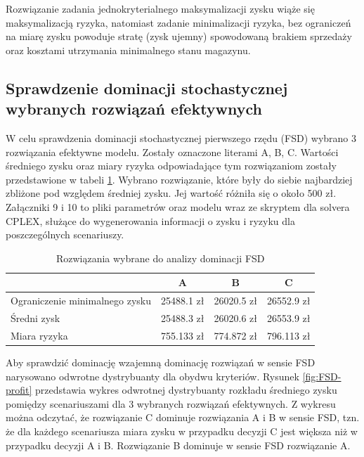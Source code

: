 \documentclass[11pt,a4paper]{article}
\begin{document}
Rozwiązanie zadania jednokryterialnego maksymalizacji zysku wiąże się maksymalizacją ryzyka, natomiast zadanie minimalizacji ryzyka, bez ograniczeń na miarę zysku powoduje stratę (zysk ujemny) spowodowaną brakiem sprzedaży oraz kosztami utrzymania minimalnego stanu magazynu.

\subsection{Sprawdzenie dominacji stochastycznej wybranych rozwiązań efektywnych}

W celu sprawdzenia dominacji stochastycznej pierwszego rzędu (FSD) wybrano 3 rozwiązania efektywne modelu. Zostały oznaczone literami A, B, C. Wartości średniego zysku oraz miary ryzyka odpowiadające tym rozwiązaniom zostały przedstawione w tabeli \ref{tab:abc}. Wybrano rozwiązanie, które były do siebie najbardziej zbliżone pod względem średniej zysku. Jej wartość różniła się o około 500 zł. Załączniki 9 i 10 to pliki parametrów oraz modelu wraz ze skryptem dla solvera CPLEX, służące do wygenerowania informacji o zysku i ryzyku dla poszczególnych scenariuszy.

\begin{table}[ht!]
  \label{tab:abc}
  \caption{Rozwiązania wybrane do analizy dominacji FSD}
  \centering
  \begin{tabular}{lccc}
  	\hline
              			& A & B & C \\
	\hline
	Ograniczenie minimalnego zysku	& 25488.1 zł & 26020.5 zł & 26552.9 zł\\
	Średni zysk   	& 25488.3 zł & 26020.6 zł & 26553.9 zł\\
	Miara ryzyka   	& 755.133 zł & 774.872 zł & 796.113 zł\\ 
	\hline
	\end{tabular}
\end{table}


Aby sprawdzić dominację wzajemną dominację rozwiązań w sensie FSD narysowano odwrotne dystrybuanty dla obydwu kryteriów. Rysunek \ref{fig:FSD-profit} przedstawia wykres odwrotnej dystrybuanty rozkładu średniego zysku pomiędzy scenariuszami dla 3 wybranych rozwiązań efektywnych. Z wykresu można odczytać, że rozwiązanie C dominuje rozwiązania A i B w sensie FSD, tzn. że dla każdego scenariusza miara zysku w przypadku decyzji C jest większa niż w przypadku decyzji A i B. Rozwiązanie B dominuje w sensie FSD rozwiązanie A.
\end{document}
